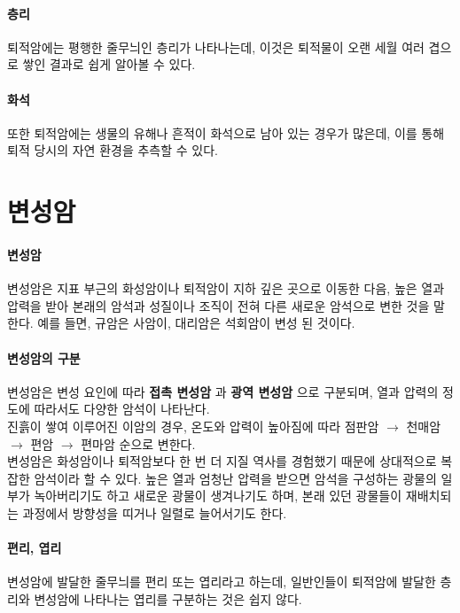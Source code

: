 \documentclass[12pt, a4paper, twoside]{book}
\begin{document}
				\paragraph{층리} 
				퇴적암에는 평행한 줄무늬인 층리가 나타나는데, 이것은 퇴적물이 오랜 세월 여러 겹으로 쌓인 결과로 쉽게 알아볼 수 있다. 
				\paragraph{화석} 
				또한 퇴적암에는 생물의 유해나 흔적이 화석으로 남아 있는 경우가 많은데, 이를 통해 퇴적 당시의 자연 환경을 추측할 수 있다.



	\clearpage
	\section{변성암}

				\paragraph{변성암} 
				변성암은 지표 부근의 화성암이나 퇴적암이 지하 깊은 곳으로 이동한 다음, 높은 열과 압력을 받아 본래의 암석과 성질이나 조직이 전혀 다른 새로운 암석으로 변한 것을 말한다. 
				예를 들면, 규암은 사암이, 대리암은 석회암이 변성 된 것이다.  \\

				\paragraph{변성암의 구분} 
				변성암은 변성 요인에 따라 \textbf{ 접촉 변성암 }과 \textbf{ 광역 변성암 }으로 구분되며, 열과 압력의 정도에 따라서도 다양한 암석이 나타난다.  \\
 
				진흙이 쌓여 이루어진 이암의 경우, 온도와 압력이 높아짐에 따라 점판암 $\rightarrow$ 천매암 $\rightarrow$ 편암 $\rightarrow$ 편마암 순으로 변한다. \\

				변성암은 화성암이나 퇴적암보다 한 번 더 지질 역사를 경험했기 때문에 상대적으로 복잡한 암석이라 할 수 있다. 
				높은 열과 엄청난 압력을 받으면 암석을 구성하는 광물의 일부가 녹아버리기도 하고 새로운 광물이 생겨나기도 하며, 본래 있던 광물들이 재배치되는 과정에서 방향성을 띠거나 일렬로 늘어서기도 한다. 

				\paragraph{편리, 엽리} 
				변성암에 발달한 줄무늬를 편리 또는 엽리라고 하는데, 일반인들이 퇴적암에 발달한 층리와 변성암에 나타나는 엽리를 구분하는 것은 쉽지 않다.
	
\end{document}
